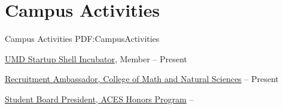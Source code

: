 
\section
{Campus Activities}
{Campus Activities}
{PDF:CampusActivities}

\BulletItem
\href{http://startupshell.org/}
{UMD Startup Shell Incubator},
Member
\hfill
{} --
Present

\GapNoBreak
\BulletItem
\href{https://cmns.umd.edu/undergraduate/admissions/recruitment-ambassadors}
{Recruitment Ambassador,
College of Math and Natural Sciences}
\hfill
{} --
Present

\GapNoBreak
\BulletItem
\href{http://aces.umd.edu/}
{Student Board President,
ACES Honors Program}
\hfill
{} --
\Gap
